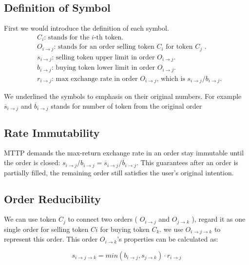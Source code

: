\documentclass[UTF8,nofonts]{article}
\begin{document}
\subsection{Definition of Symbol}

First we would introduce the definition of each symbol.
\[
\begin{split}
&C_{i}\text{: \ }\text{stands for the $i$-th token.}\\
&O_{i\rightarrow j}\text{: \ }\text{stands for an order selling token $C_{i}$ for token $C_{j}$ .}\\
&s_{i\rightarrow j}\text{: \ }\text{selling token upper limit in order $O_{i\rightarrow j}$.}\\
&b_{i\rightarrow j}\text{: \ }\text{buying token lower limit in order $O_{i\rightarrow j}$.}\\
&r_{i\rightarrow j}\text{: \ }\text{max exchange rate in order $O_{i\rightarrow j}$, which is $s_{i\rightarrow j} / b_{i\rightarrow j}$.}
\end{split}
\]


We underlined the symbols to emphasis on their original numbers. For example $\overline{s}_{i\rightarrow j}$ and $\overline{b}_{i\rightarrow j}$ stands for number of token from the original order

\subsection{Rate Immutability\label{sec: consistrate}}

MTTP demands the max-return exchange rate in an order stay immutable until the order is closed: 
$s_{i\rightarrow j} / b_{i\rightarrow j} = \overline{s}_{i\rightarrow j}/ \overline{b}_{i\rightarrow j}$. This guarantees after an order is partially filled, the remaining order still satisfies the user's original intention.

\subsection{Order Reducibility\label{sec: reducibility}}


We can use token $C_j$ to connect two orders ( $O_{i\rightarrow j}$ and $O_{j\rightarrow k}$ ),  regard it as one single order for selling token $Ci$ for buying token $C_k$. we use $O_{i\rightarrow j\rightarrow k}$ to represent this order. This order $O_{i\rightarrow k}$'s properties can be calculated as: 

\begin{equation}
s_{i\rightarrow j\rightarrow k}=min(b_{i\rightarrow j}, s_{j\rightarrow k}) \cdot r_{i\rightarrow j}
\end{equation}
\end{document}

